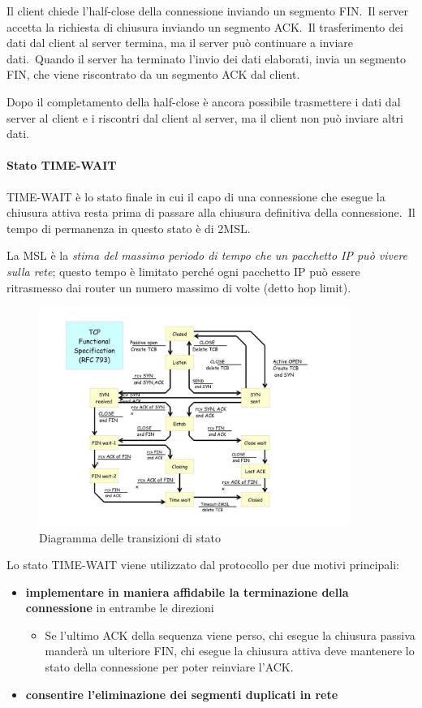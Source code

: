 Il client chiede l'half-close della connessione inviando un segmento FIN.\
Il server accetta la richiesta di chiusura inviando un segmento ACK.\
Il trasferimento dei dati dal client al server termina, ma il server può continuare a inviare dati.\
Quando il server ha terminato l'invio dei dati elaborati, invia un segmento FIN, che viene riscontrato da un segmento ACK dal client.

Dopo il completamento della half-close è ancora possibile trasmettere i dati dal server al client e i riscontri dal client al server, ma il client non può inviare altri dati.

\paragraph{Stato TIME-WAIT}

TIME-WAIT è lo stato finale in cui il capo di una connessione che esegue la chiusura attiva resta prima di passare alla chiusura definitiva della connessione.\
Il tempo di permanenza in questo stato è di 2MSL.

La MSL è la \emph{stima del massimo periodo di tempo che un pacchetto IP può vivere sulla rete}; questo tempo è limitato perché ogni pacchetto IP può essere ritrasmesso dai router un numero massimo di volte (detto hop limit).

\begin{figure}[H]
    \centering
    \includegraphics[width=0.9\textwidth]{immagini/Diagramma.jpg}
    \caption*{Diagramma delle transizioni di stato}
\end{figure}

Lo stato TIME-WAIT viene utilizzato dal protocollo per due motivi principali:
\begin{itemize}
    \item \textbf{implementare in maniera affidabile la terminazione della connessione} in entrambe le direzioni
          \begin{itemize}
              \item Se l'ultimo ACK della sequenza viene perso, chi esegue la chiusura passiva manderà un ulteriore FIN, chi esegue la chiusura attiva deve mantenere lo stato della connessione per poter reinviare l'ACK.
          \end{itemize}
    \item \textbf{consentire l'eliminazione dei segmenti duplicati in rete}
\end{itemize}

